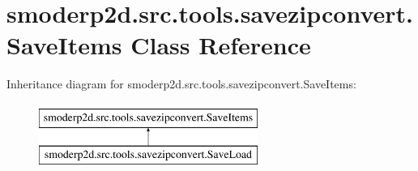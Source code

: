 \hypertarget{classsmoderp2d_1_1src_1_1tools_1_1savezipconvert_1_1SaveItems}{\section{smoderp2d.\-src.\-tools.\-savezipconvert.\-Save\-Items Class Reference}
\label{classsmoderp2d_1_1src_1_1tools_1_1savezipconvert_1_1SaveItems}
}
Inheritance diagram for smoderp2d.\-src.\-tools.\-savezipconvert.\-Save\-Items\-:\begin{figure}[H]
\begin{center}
\leavevmode
\includegraphics[height=2.000000cm]{d0/ddc/classsmoderp2d_1_1src_1_1tools_1_1savezipconvert_1_1SaveItems}
\end{center}
\end{figure}
